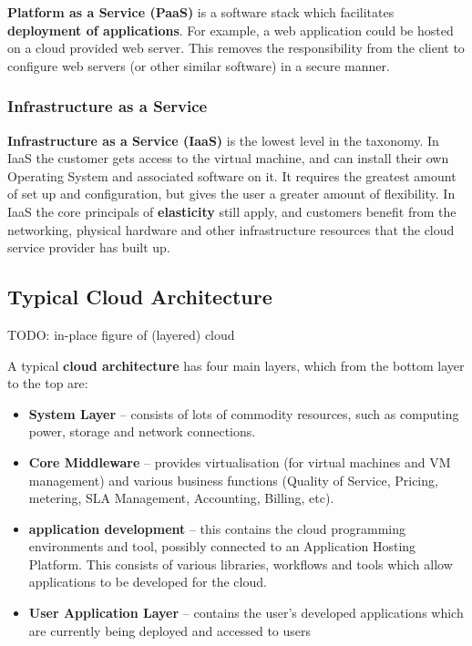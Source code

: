 \documentclass{article}
\begin{document}
{\textbf{Platform as a Service (PaaS)} is a software stack which facilitates \textbf{deployment of applications}. For example, a web application could be hosted on a cloud provided web server. This removes the responsibility from the client to configure web servers (or other similar software) in a secure manner.

\subsubsection{Infrastructure as a Service}

\textbf{Infrastructure as a Service (IaaS)} is the lowest level in the taxonomy. In IaaS the customer gets access to the virtual machine, and can install their own Operating System and associated software on it. It requires the greatest amount of set up and configuration, but gives the user a greater amount of flexibility. In IaaS the core principals of \textbf{elasticity} still apply, and customers benefit from the networking, physical hardware and other infrastructure resources that the cloud service provider has built up. 

\subsection{Typical Cloud Architecture}

TODO: in-place figure of (layered) cloud

A typical \textbf{cloud architecture} has four main layers, which from the bottom layer to the top are:
\begin{itemize}
	\item \textbf{System Layer} -- consists of lots of commodity resources, such as computing power, storage and network connections.
	\item \textbf{Core Middleware} -- provides virtualisation (for virtual machines and VM management) and various business functions (Quality of Service, Pricing, metering, SLA Management, Accounting, Billing, etc).
	\item \textbf{application development} -- this contains the cloud programming environments and tool, possibly connected to an Application Hosting Platform. This consists of various libraries, workflows and tools which allow applications to be developed for the cloud. 
	\item \textbf{User Application Layer} -- contains the user's developed applications which are currently being deployed and accessed to users



\end{itemize}}
\end{document}
